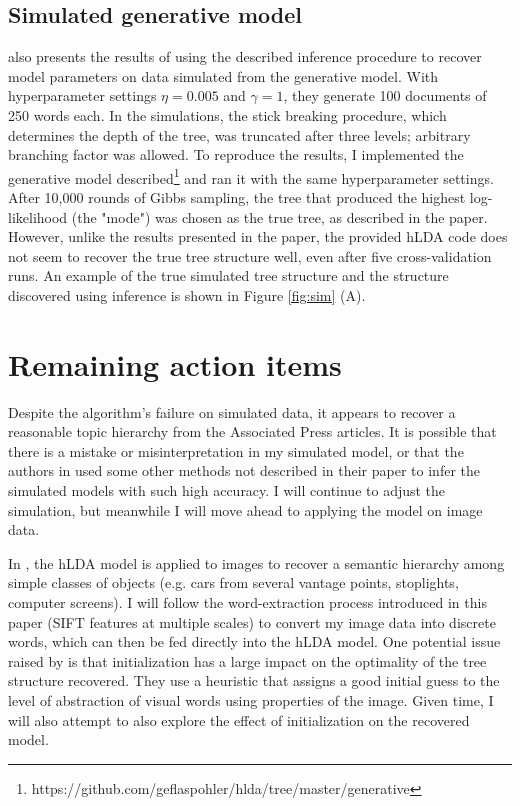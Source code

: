 \documentclass{article}
\begin{document}
\subsection{Simulated generative model}
\citet{Blei2010} also presents the results of using the described inference procedure to recover model parameters on data simulated from the generative model. With hyperparameter settings $\eta = 0.005$ and $\gamma = 1$, they generate 100 documents of 250 words each. In the simulations, the stick breaking procedure, which determines the depth of the tree, was truncated after three levels; arbitrary branching factor was allowed. To reproduce the results, I implemented the generative model described\footnote{https://github.com/geflaspohler/hlda/tree/master/generative} and ran it with the same hyperparameter settings. After 10,000 rounds of Gibbs sampling, the tree that produced the highest log-likelihood (the "mode") was chosen as the true tree, as described in the paper. However, unlike the results presented in the paper, the provided hLDA code does not seem to recover the true tree structure well, even after five cross-validation runs. An example of the true simulated tree structure and the structure discovered using inference is shown in Figure \ref{fig:sim} (A).

\section{Remaining action items}
Despite the algorithm's failure on simulated data, it appears to recover a reasonable topic hierarchy from the Associated Press articles. It is possible that there is a mistake or misinterpretation in my simulated model, or that the authors in \citet{Blei2010} used some other methods not described in their paper to infer the simulated models with such high accuracy. I will continue to adjust the simulation, but meanwhile I will move ahead to applying the model on image data.

In \citet{Sivic}, the hLDA model is applied to images to recover a semantic hierarchy among simple classes of objects (e.g. cars from several vantage points, stoplights, computer screens). I will follow the word-extraction process introduced in this paper (SIFT features at multiple scales) to convert my image data into discrete words, which can then be fed directly into the hLDA model. One potential issue raised by \citet{Sivic} is that initialization has a large impact on the optimality of the tree structure recovered. They use a heuristic that assigns a good initial guess to the level of abstraction of visual words using properties of the image. Given time, I will also attempt to also explore the effect of initialization on the recovered model. 
\end{document}
